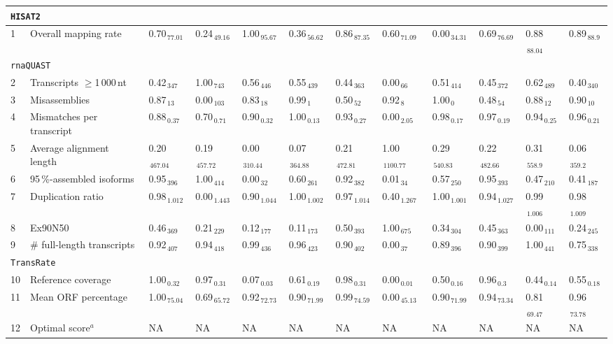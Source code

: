 \documentclass{scrartcl}
\begin{document}
\begin{landscape}
\begin{table}
\begin{scriptsize}
\begin{tabular}{llllllllllll}
\multicolumn{11}{l}{\texttt{HISAT2}}\\ 
\midrule
1 & Overall mapping rate  & 0.70$_{\,77.01}$ & 0.24$_{\,49.16}$ & 1.00$_{\,95.67}$ & 0.36$_{\,56.62}$ & 0.86$_{\,87.35}$ & 0.60$_{\,71.09}$ & 0.00$_{\,34.31}$ & 0.69$_{\,76.69}$ & 0.88$_{\,88.04}$ & 0.89$_{\,88.9}$ \\\midrule
\multicolumn{11}{l}{\texttt{rnaQUAST}}\\ 
\midrule
2 & Transcripts $\geq$1\,000\,nt  & 0.42$_{\,347}$ & 1.00$_{\,743}$ & 0.56$_{\,446}$ & 0.55$_{\,439}$ & 0.44$_{\,363}$ & 0.00$_{\,66}$ & 0.51$_{\,414}$ & 0.45$_{\,372}$ & 0.62$_{\,489}$ & 0.40$_{\,340}$ \\3 & Misassemblies  & 0.87$_{\,13}$ & 0.00$_{\,103}$ & 0.83$_{\,18}$ & 0.99$_{\,1}$ & 0.50$_{\,52}$ & 0.92$_{\,8}$ & 1.00$_{\,0}$ & 0.48$_{\,54}$ & 0.88$_{\,12}$ & 0.90$_{\,10}$ \\4 & Mismatches per transcript  & 0.88$_{\,0.37}$ & 0.70$_{\,0.71}$ & 0.90$_{\,0.32}$ & 1.00$_{\,0.13}$ & 0.93$_{\,0.27}$ & 0.00$_{\,2.05}$ & 0.98$_{\,0.17}$ & 0.97$_{\,0.19}$ & 0.94$_{\,0.25}$ & 0.96$_{\,0.21}$ \\5 & Average alignment length  & 0.20$_{\,467.04}$ & 0.19$_{\,457.72}$ & 0.00$_{\,310.44}$ & 0.07$_{\,364.88}$ & 0.21$_{\,472.81}$ & 1.00$_{\,1100.77}$ & 0.29$_{\,540.83}$ & 0.22$_{\,482.66}$ & 0.31$_{\,558.9}$ & 0.06$_{\,359.2}$ \\6 & 95\,\%-assembled isoforms  & 0.95$_{\,396}$ & 1.00$_{\,414}$ & 0.00$_{\,32}$ & 0.60$_{\,261}$ & 0.92$_{\,382}$ & 0.01$_{\,34}$ & 0.57$_{\,250}$ & 0.95$_{\,393}$ & 0.47$_{\,210}$ & 0.41$_{\,187}$ \\7 & Duplication ratio  & 0.98$_{\,1.012}$ & 0.00$_{\,1.443}$ & 0.90$_{\,1.044}$ & 1.00$_{\,1.002}$ & 0.97$_{\,1.014}$ & 0.40$_{\,1.267}$ & 1.00$_{\,1.001}$ & 0.94$_{\,1.027}$ & 0.99$_{\,1.006}$ & 0.98$_{\,1.009}$ \\\midrule
8 & Ex90N50  & 0.46$_{\,369}$ & 0.21$_{\,229}$ & 0.12$_{\,177}$ & 0.11$_{\,173}$ & 0.50$_{\,393}$ & 1.00$_{\,675}$ & 0.34$_{\,304}$ & 0.45$_{\,363}$ & 0.00$_{\,111}$ & 0.24$_{\,245}$ \\9 & \# full-length transcripts  & 0.92$_{\,407}$ & 0.94$_{\,418}$ & 0.99$_{\,436}$ & 0.96$_{\,423}$ & 0.90$_{\,402}$ & 0.00$_{\,37}$ & 0.89$_{\,396}$ & 0.90$_{\,399}$ & 1.00$_{\,441}$ & 0.75$_{\,338}$ \\\midrule
\multicolumn{11}{l}{\texttt{TransRate}}\\ 
\midrule
10 & Reference coverage  & 1.00$_{\,0.32}$ & 0.97$_{\,0.31}$ & 0.07$_{\,0.03}$ & 0.61$_{\,0.19}$ & 0.98$_{\,0.31}$ & 0.00$_{\,0.01}$ & 0.50$_{\,0.16}$ & 0.96$_{\,0.3}$ & 0.44$_{\,0.14}$ & 0.55$_{\,0.18}$ \\11 & Mean ORF percentage  & 1.00$_{\,75.04}$ & 0.69$_{\,65.72}$ & 0.92$_{\,72.73}$ & 0.90$_{\,71.99}$ & 0.99$_{\,74.59}$ & 0.00$_{\,45.13}$ & 0.90$_{\,71.99}$ & 0.94$_{\,73.34}$ & 0.81$_{\,69.47}$ & 0.96$_{\,73.78}$ \\12 & Optimal score$^{a}$  & NA & NA & NA & NA & NA & NA & NA & NA & NA & NA\\ 

\end{tabular}
\end{scriptsize}
\end{table}
\end{landscape}
\end{document}
